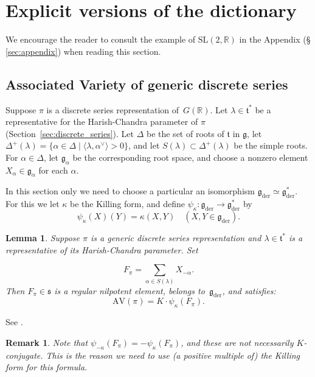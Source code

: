 \documentclass[cupthm]{CUP-JNL-JMJ}
\numberwithin{equation}{section}
\theoremstyle{cupplain}
\newtheorem{lemma}[theorem]{Lemma}
\theoremstyle{cupdefinition}
\theoremstyle{cupremark}
\newtheorem{remark}[theorem]{Remark}
\theoremstyle{cupproof}
\newcommand{\R}{\mathbb R}
\newcommand{\ch}[1]{#1^\vee}
\renewcommand{\t}{\mathfrak t}
\newcommand{\g}{\mathfrak g}
\newcommand{\gder}{\mathfrak g_{\mathrm{der}}}
\newcommand{\s}{\mathfrak s}
\newcommand{\AV}{\mathrm{AV}}
\begin{document}
\section{Explicit versions of the dictionary}\label{sec:explicit}

We encourage the reader to consult the example of $\mathrm{SL}(2,\R)$ in the Appendix (\S\,\ref{sec:appendix}) when reading this section.

\subsection{Associated Variety of generic discrete series}
\label{s:AV}

Suppose $\pi$ is a  discrete series representation of~$G(\R)$. Let
$\lambda\in\t^*$ be a representative for the Harish-Chandra parameter of $\pi$ (Section~\ref{sec:discrete_series}). Let $\Delta$ be the set of roots of $\t$ in $\g$, 
let $\Delta^+(\lambda)=\{\alpha \in \Delta \mid \langle\lambda,\ch\alpha\rangle>0\}$,
and let $S(\lambda)\subset\Delta^+(\lambda)$ be the simple roots.
For $\alpha\in \Delta$, let $\g_\alpha$ be the corresponding root space, and choose a nonzero element $X_\alpha\in\g_\alpha$ for each $\alpha$.

In this section only we need to  choose a particular an isomorphism \mbox{$\gder\simeq \gder^*$}.
For this we let $\kappa$ be the Killing form, and define $\psi_\kappa:\gder\rightarrow \gder^*$ by
$$
\psi_\kappa(X)(Y)=\kappa(X,Y)\quad (X,Y\in \gder).
$$

\begin{lemma}
\label{l:pi_to_av}
  \label{l:AV}
Suppose $\pi$ is a generic discrete series representation and $\lambda\in\t^*$ is a representative of its  Harish-Chandra parameter.
Set

\begin{equation}
  \label{e:Fpi}
  F_\pi=\sum_{\alpha\in S(\lambda)}X_{-\alpha}.
\end{equation}
Then $F_\pi\in\s$ is a regular nilpotent element, belongs to~$\gder$, and satisfies: 
$$
\AV(\pi)=K\cdot \psi_\kappa(F_\pi).
$$
\end{lemma}
See
\cite[Propositions A.7 and A.9]{AV1}.

\begin{remark}
Note that $\psi_{-\kappa}(F_\pi)=-\psi_{\kappa}(F_\pi)$, and these are not necessarily $K$-conjugate.
  This is the reason we need to use (a positive multiple of) the Killing form for this formula.
\end{remark}
\end{document}
